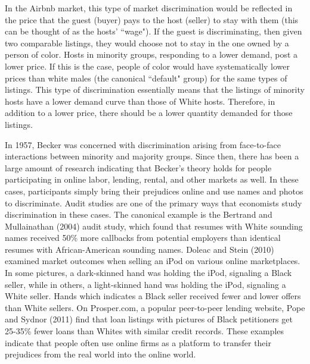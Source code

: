\documentclass[11pt, oneside]{article}
\begin{document}
In the Airbnb market, this type of market discrimination would be reflected in the price that the guest (buyer) pays to the host (seller) to stay with them (this can be thought of as the hosts' ``wage"). If the guest is discriminating, then given two comparable listings, they would choose not to stay in the one owned by a person of color. Hosts in minority groups, responding to a lower demand, post a lower price. If this is the case, people of color would have systematically lower prices than white males (the canonical ``default" group) for the same types of listings. This type of discrimination essentially means that the listings of minority hosts have a lower demand curve than those of White hosts. Therefore, in addition to a lower price, there should be a lower quantity demanded for those listings.  

In 1957, Becker was concerned with discrimination arising from face-to-face interactions between minority and majority groups. Since then, there has been a large amount of research indicating that Becker's theory holds for people participating in online labor, lending, rental, and other markets as well. In these cases, participants simply bring their prejudices online and use names and photos to discriminate. Audit studies are one of the primary ways that economists study discrimination in these cases. The canonical example is the Bertrand and Mullainathan (2004) audit study, which found that resumes with White sounding names received 50\% more callbacks from potential employers than identical resumes with African-American sounding names.\cite{bertrand} Doleac and Stein (2010) examined market outcomes when selling an iPod on various online marketplaces. In some pictures, a dark-skinned hand was holding the iPod, signaling a Black seller, while in others, a light-skinned hand was holding the iPod, signaling a White seller.\cite{doleac} Hands which indicates a Black seller received fewer and lower offers than White sellers. On Prosper.com, a popular peer-to-peer lending website, Pope and Sydnor (2011) find that loan listings with pictures of Black petitioners get 25-35\% fewer loans than Whites with similar credit records.\cite{pope} These examples indicate that people often use online firms as a platform to transfer their prejudices from the real world into the online world.   
\end{document}
